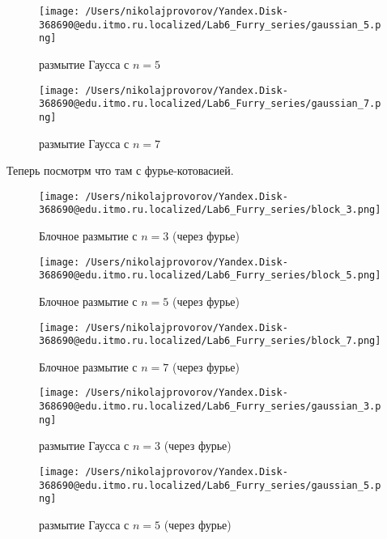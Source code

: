 \clearpage

\begin{figure}[ht!]
    \centering
    \texttt{[image: /Users/nikolajprovorov/Yandex.Disk-368690@edu.itmo.ru.localized/Lab6\_Furry\_series/gaussian\_5.png]}
    \caption{размытие Гаусса с $n = 5$}
\end{figure}

\begin{figure}[ht!]
    \centering
    \texttt{[image: /Users/nikolajprovorov/Yandex.Disk-368690@edu.itmo.ru.localized/Lab6\_Furry\_series/gaussian\_7.png]}
    \caption{размытие Гаусса с $n = 7$}
\end{figure}

\clearpage

Теперь посмотрм что там с фурье-котовасией.

\begin{figure}[ht!]
    \centering
    \texttt{[image: /Users/nikolajprovorov/Yandex.Disk-368690@edu.itmo.ru.localized/Lab6\_Furry\_series/block\_3.png]}
    \caption{Блочное размытие с $n = 3$ (через фурье)}
\end{figure}

\begin{figure}[ht!]
    \centering
    \texttt{[image: /Users/nikolajprovorov/Yandex.Disk-368690@edu.itmo.ru.localized/Lab6\_Furry\_series/block\_5.png]}
    \caption{Блочное размытие с $n = 5$ (через фурье)}
\end{figure}

\clearpage

\begin{figure}[ht!]
    \centering
    \texttt{[image: /Users/nikolajprovorov/Yandex.Disk-368690@edu.itmo.ru.localized/Lab6\_Furry\_series/block\_7.png]}
    \caption{Блочное размытие с $n = 7$ (через фурье)}
\end{figure}

\begin{figure}[ht!]
    \centering
    \texttt{[image: /Users/nikolajprovorov/Yandex.Disk-368690@edu.itmo.ru.localized/Lab6\_Furry\_series/gaussian\_3.png]}
    \caption{размытие Гаусса с $n = 3$ (через фурье)}
\end{figure}

\clearpage

\begin{figure}[ht!]
    \centering
    \texttt{[image: /Users/nikolajprovorov/Yandex.Disk-368690@edu.itmo.ru.localized/Lab6\_Furry\_series/gaussian\_5.png]}
    \caption{размытие Гаусса с $n = 5$ (через фурье)}
\end{figure}

